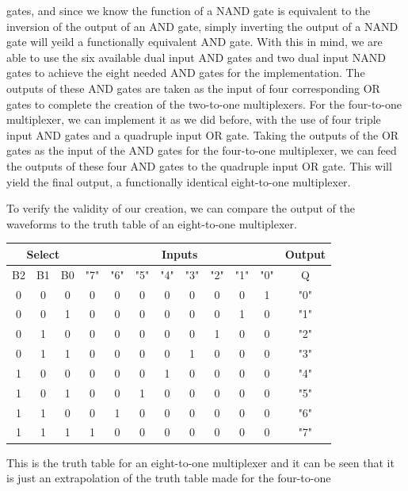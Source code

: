 \documentclass[12pt]{article}
\begin{document}
gates, and since we know the function of a NAND gate is equivalent to the
inversion of the output of an AND gate, simply inverting the output of a NAND
gate will yeild a functionally equivalent AND gate. With this in mind, we are
able to use the six available dual input AND gates and two dual input NAND
gates to achieve the eight needed AND gates for the implementation. The outputs
of these AND gates are taken as the input of four corresponding OR gates to
complete the creation of the two-to-one multiplexers. For the four-to-one
multiplexer, we can implement it as we did before, with the use of four triple
input AND gates and a quadruple input OR gate. Taking the outputs of the OR
gates as the input of the AND gates for the four-to-one multiplexer, we can feed
the outputs of these four AND gates to the quadruple input OR gate. This will
yield the final output, a functionally identical eight-to-one multiplexer.
\par To verify the validity of our creation, we can compare the output of the
waveforms to the truth table of an eight-to-one multiplexer.
\begin{center}
    \begin{tabular}{ccc|cccccccc|c}
        \toprule
        \multicolumn{3}{c}{Select} & \multicolumn{8}{|c|}{Inputs} & Output \\
        \midrule
        B2 & B1 & B0 & "7" & "6" & "5" & "4" &"3" & "2" & "1" & "0" & Q \\
        \midrule
        0 & 0 & 0 & 0 & 0 & 0 & 0 & 0 & 0 & 0 & 1 & "0" \\
        0 & 0 & 1 & 0 & 0 & 0 & 0 & 0 & 0 & 1 & 0 & "1" \\
        0 & 1 & 0 & 0 & 0 & 0 & 0 & 0 & 1 & 0 & 0 & "2" \\
        0 & 1 & 1 & 0 & 0 & 0 & 0 & 1 & 0 & 0 & 0 & "3" \\
        1 & 0 & 0 & 0 & 0 & 0 & 1 & 0 & 0 & 0 & 0 & "4" \\
        1 & 0 & 1 & 0 & 0 & 1 & 0 & 0 & 0 & 0 & 0 & "5" \\
        1 & 1 & 0 & 0 & 1 & 0 & 0 & 0 & 0 & 0 & 0 & "6" \\
        1 & 1 & 1 & 1 & 0 & 0 & 0 & 0 & 0 & 0 & 0 & "7" \\
        \bottomrule
    \end{tabular}
\end{center}
\par This is the truth table for an eight-to-one multiplexer and it can be seen
that it is just an extrapolation of the truth table made for the four-to-one
\end{document}
